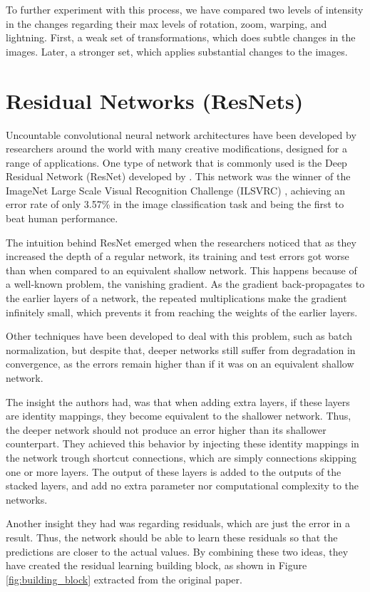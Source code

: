 To further experiment with this process, we have compared two levels of intensity in the changes regarding their max levels of rotation, zoom, warping, and lightning. First, a weak set of transformations, which does subtle changes in the images. Later, a stronger set, which applies substantial changes to the images.

\section{Residual Networks (ResNets)}

Uncountable convolutional neural network architectures have been developed by researchers around the world with many creative modifications, designed for a range of applications. One type of network that is commonly used is the Deep Residual Network (ResNet) developed by \cite{ParkhiVZ15}. This network was the winner of the ImageNet Large Scale Visual Recognition Challenge (ILSVRC) \citep{ILSVRC15}, achieving an error rate of only 3.57\% in the image classification task and being the first to beat human performance.

The intuition behind ResNet emerged when the researchers noticed that as they increased the depth of a regular network, its training and test errors got worse than when compared to an equivalent shallow network. This happens because of a well-known problem, the vanishing gradient. As the gradient back-propagates to the earlier layers of a network, the repeated multiplications make the gradient infinitely small, which prevents it from reaching the weights of the earlier layers.

Other techniques have been developed to deal with this problem, such as batch normalization, but despite that, deeper networks still suffer from degradation in convergence, as the errors remain higher than if it was on an equivalent shallow network.

The insight the authors had, was that when adding extra layers, if these layers are identity mappings, they become equivalent to the shallower network. Thus, the deeper network should not produce an error higher than its shallower counterpart. They achieved this behavior by injecting these identity mappings in the network trough shortcut connections, which are simply connections skipping one or more layers. The output of these layers is added to the outputs of the stacked layers, and add no extra parameter nor computational complexity to the networks.

Another insight they had was regarding residuals, which are just the error in a result. Thus, the network should be able to learn these residuals so that the predictions are closer to the actual values. By combining these two ideas, they have created the residual learning building block, as shown in Figure \ref{fig:building_block} extracted from the original paper.

